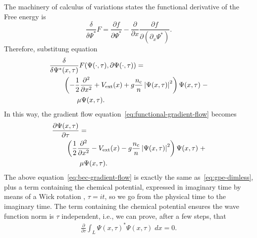 \documentclass[twocolumn,showpacs,showkeys,preprintnumbers,superscriptaddress, pra, 10pt, aps]{revtex4-2}
\begin{document}
The machinery of calculus of variations states the functional derivative of the Free energy is
%
\begin{equation}
  \frac{\delta}{\delta \Psi^*} F =\frac{\partial f}{\partial \Psi^*} - \frac{\partial}{\partial x} \frac{\partial f}{\partial (\partial_x \Psi^*)}.
\end{equation}
%
Therefore, substitung equation %
%
\begin{align}
  \nonumber
   & \frac{\delta}{\delta \Psi^*(x, \tau)} F(\Psi(\cdot, \tau), \partial \Psi(\cdot, \tau)) =                                                                           \\
  \nonumber
   & \qquad \left( -\frac{1}{2} \frac{\partial^2}{\partial x^2} + V_\mathrm{ext}(x) + g \frac{n_{\mathrm{c}}}{n} \left| \Psi(x, \tau) \right|^2 \right) \Psi(x, \tau) \; - \\
   & \qquad \qquad \mu \Psi(x, \tau).
\end{align}
In this way, the gradient flow equation~\eqref{eq:functional-gradient-flow} becomes
%
\begin{align}
  \nonumber
   & \frac{\partial \Psi(x, \tau)}{\partial \tau} =                                                                                                                    \\
  \nonumber
   & \qquad \left( \frac{1}{2} \frac{\partial^2}{\partial x^2} - V_\mathrm{ext}(x) - g \frac{n_{\mathrm{c}}}{n} \left| \Psi(x, \tau) \right|^2 \right) \Psi(x, \tau) \; + \\
  \label{eq:bec-gradient-flow}
   & \qquad \qquad \mu \Psi(x, \tau).
\end{align}
%
The above equation~\eqref{eq:bec-gradient-flow} is exactly the same as~\eqref{eq:gpe-dimless}, plus
a term containing the chemical potential, expressed in imaginary time by means of a Wick rotation
\cite{Succi}, $\tau = i t$, so we go from the physical time to the imaginary
time. The term containing the chemical potential ensures the wave function norm is $\tau$ independent, i.e.,
we can prove, after a few steps, that
%
\begin{align}
  \frac{\partial}{\partial \tau} \int_{L} {\Psi(x, \tau)}^*\Psi(x, \tau) \; dx = 0.
  \label{eq:tau-independent}
\end{align}
\end{document}

